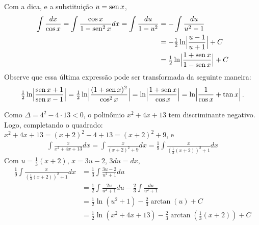 \begin{Solution}{9.24}
Com a dica, e a substituição $u=\operatorname{sen} x$,
\begin{align*}
\int \frac{dx}{\cos x}=\int\frac{\cos x}{1-\operatorname{sen}^2
x}dx=\int\frac{du}{1-u^2}&=-\int\frac{du}{u^2-1}\\
&=-\tfrac{1}{2}\ln\Bigl|\frac{u-1}{u+1}\Bigr|+C\\
&=\tfrac{1}{2}\ln\Bigl|\frac{1+\operatorname{sen} x}{1-\operatorname{sen} x}\Bigr|+C
\end{align*}
Observe que essa última expressão pode ser transformada da seguinte maneira:
\begin{align*}
\tfrac{1}{2}\ln\Bigl|\frac{\operatorname{sen} x+1}{\operatorname{sen} x-1}\Bigr|=
\tfrac{1}{2}\ln\Bigl|\frac{(1+\operatorname{sen} x)^2}{\cos^2x}\Bigr|=
\ln\Bigl|\frac{1+\operatorname{sen} x}{\cos x}\Bigr|=
\ln\Bigl|\frac{1}{\cos x}+\tan x\Bigr|\,.
\end{align*}
\end{Solution}
\begin{Solution}{9.25}
Como $\Delta=4^2-4\cdot 13<0$, o polinômio $x^2+4x+13$ tem discriminante
negativo. Logo, completando o quadrado:
$x^2+4x+13=(x+2)^2-4+13=(x+2)^2+9$, e
\begin{align*}
\int \frac{x}{x^2+4x+13}dx=\int
\frac{x}{(x+2)^2+9}dx=\tfrac19\int\frac{x}{(\tfrac13(x+2))^2+1}dx
\end{align*}
Com $u=\frac{1}{3}(x+2)$, $x=3u-2$, $3du=dx$,
\begin{align*}
 \tfrac19\int\frac{x}{(\tfrac13(x+2))^2+1}dx&=\tfrac13\int\frac{3u-2}{u^2+1}du\\
&=\tfrac12\int\frac{2u}{u^2+1}du-\tfrac23\int\frac{du}{u^2+1}\\
&=\tfrac12\ln (u^2+1)-\tfrac23 \arctan(u)+C\\
&=\tfrac12\ln (x^2+4x+13)-\tfrac23\arctan(\frac{1}{3}(x+2))+C
\end{align*}
\end{Solution}
